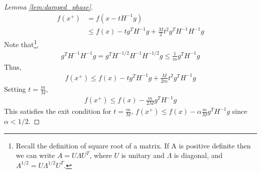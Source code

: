 \documentclass[12pt]{report}
\begin{document}
\begin{proof}[Lemma \ref{lem:damped_phase}]
\begin{align}
f(x^{+}) & = f(x-tH^{-1}g) \\
	& \le f(x) - tg^TH^{-1}g + \frac{M}{2}t^2g^TH^{-1}H^{-1}g
\end{align}
Note that\footnote{Recall the definition of square root of a matrix. If A is positive definite then we can write $A=U \Lambda U^T$, where $U$ is unitary and $\Lambda$ is diagonal, and $A^{1/2}=U \Lambda^{1/2} U^T$. },
\begin{align}
g^TH^{-1}H^{-1}g = g^TH^{-1/2}H^{-1}H^{-1/2}g \le \frac{1}{m} g^T H^{-1}g
\end{align}
Thus,
\begin{align}
f(x^{+}) \le f(x) - tg^TH^{-1}g + \frac{M}{2m}t^2 g^T H^{-1}g
\end{align}
Setting $t=\frac{m}{M}$,
\begin{align}
f(x^{+}) \le f(x) -  \frac{m}{2M} g^T H^{-1}g
\end{align}
This satisfies the exit condition for $t=\frac{m}{M}$, $f(x^{+}) \le f(x) - \alpha \frac{m}{M} g^T H^{-1}g$ since $\alpha<1/2$. 
\end{proof}
\end{document}
